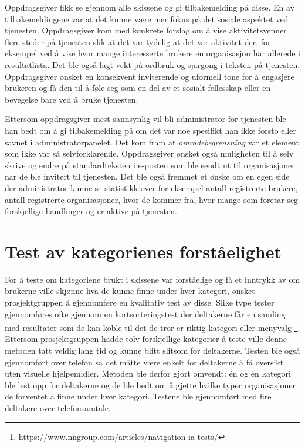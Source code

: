 Oppdragsgiver fikk se gjennom alle skissene og gi tilbakemelding på disse. En av tilbakemeldingene var at det kunne være mer fokus på det sosiale aspektet ved tjenesten. Oppdragsgiver kom med konkrete forslag om å vise aktivitetsvenner flere steder på tjenesten slik at det var tydelig at det var aktivitet der, for eksempel ved å vise hvor mange interesserte brukere en organisasjon har allerede i resultatlista. Det ble også lagt vekt på ordbruk og sjargong i teksten på tjenesten. Oppdragsgiver ønsket en konsekvent inviterende og uformell tone for å engasjere brukeren og få den til å føle seg som en del av et sosialt fellesskap eller en bevegelse bare ved å bruke tjenesten.

Ettersom oppdragsgiver mest sannsynlig vil bli administrator for tjenesten ble han bedt om å gi tilbakemelding på om det var noe spesifikt han ikke forsto eller savnet i administratorpanelet. Det kom fram at {\em  områdebegrensning} var et element som ikke var så selvforklarende. Oppdragsgiver ønsket også muligheten til å selv skrive og endre på standardteksten i e-posten som ble sendt ut til organisasjoner når de ble invitert til tjenesten. Det ble også fremmet et ønske om en egen side der administrator kunne se statistikk over for eksempel antall registrerte brukere, antall registrerte organisasjoner, hvor de kommer fra, hvor mange som foretar seg forskjellige handlinger og er aktive på tjenesten.

\section{Test av kategorienes forståelighet}
For å teste om kategoriene brukt i skissene var forståelige og få et inntrykk av om brukerne ville skjønne hva de kunne finne under hver kategori, ønsket prosjektgruppen å gjennomføre en kvalitativ test av disse. Slike type tester gjennomføres ofte gjennom en kortsorteringstest der deltakerne får en samling med resultater som de kan koble til det de tror er riktig kategori eller menyvalg \footnote{https://www.nngroup.com/articles/navigation-ia-tests/}. Ettersom prosjektgruppen hadde tolv forskjellige kategorier å teste ville denne metoden tatt veldig lang tid og kunne blitt slitsom for deltakerne. Testen ble også gjennomført over telefon så det måtte være enkelt for deltakerne å få oversikt uten visuelle hjelpemidler. Metoden ble derfor gjort omvendt: én og én kategori ble lest opp for deltakerne og de ble bedt om å gjette hvilke typer organisasjoner de forventet å finne under hver kategori. Testene ble gjennomført med fire deltakere over telefonsamtale.

